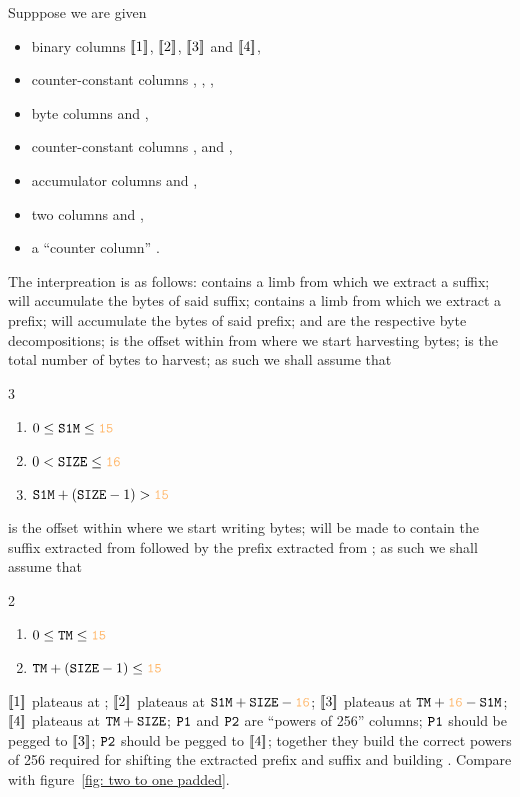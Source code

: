 Supppose we are given
\begin{itemize}
	\item binary columns $[\![1]\!]$, $[\![2]\!]$, $[\![3]\!]$ and $[\![4]\!]$,
	\item counter-constant columns  \sourceOne{}, \sourceTwo{}, \target{},
	\item byte columns \sourceOne{}\byte{} and \sourceTwo{}\byte{},
	\item counter-constant columns \sourceOne{}\mark{}, \target{}\mark{} and \size{},
	\item accumulator columns  and ,
	\item two columns  and ,
	\item a ``counter column'' \ct{}.
\end{itemize}
The interpreation is as follows:
\sourceOne{} contains a limb from which we extract a suffix;
 will accumulate the bytes of said suffix;
\sourceTwo{} contains a limb from which we extract a prefix;
 will accumulate the bytes of said prefix;
\sourceOne{}\byte{} and \sourceTwo{}\byte{} are the respective byte decompositions;
\sourceOne{}\mark{} is the offset within \sourceOne{} from where we start harvesting bytes;
\size{} is the total number of bytes to harvest;
as such we shall assume that
\begin{multicols}{3}
	\begin{enumerate}
		\item $0 \leq \sourceOne\mark \leq \llargeMO$
		\item $0 < \size \leq \llarge$
		\item $\sourceOne{}\mark{} + (\size{}-1) > \llargeMO$
	\end{enumerate}
\end{multicols}
\noindent
\target{}\mark{} is the offset within \target{} where we start writing bytes;
\target{} will be made to contain the suffix extracted from \sourceOne{} followed by the prefix extracted from \sourceTwo{};
as such we shall assume that
\begin{multicols}{2}
	\begin{enumerate}
		\item $0 \leq \target\mark \leq \llargeMO$
		\item $\target{}\mark{} + (\size{}-1) \leq \llargeMO$
	\end{enumerate}
\end{multicols}
\noindent 
$[\![1]\!]$ plateaus at \sourceOne{}\mark{};
$[\![2]\!]$ plateaus at $\sourceOne{}\mark{} + \size{} - \llarge$;
$[\![3]\!]$ plateaus at $\target\mark + \llarge - \sourceOne{}\mark{}$;
$[\![4]\!]$ plateaus at $\texttt{T}\texttt{M} + \texttt{SIZE}{}$;
$\texttt{P1}$ and $\texttt{P2}$ are ``powers of 256'' columns;
$\texttt{P1}$ should be pegged to $[\![3]\!]$;
$\texttt{P2}$ should be pegged to $[\![4]\!]$;
together they build the correct powers of 256 required for shifting the extracted prefix and suffix and building \target{}. Compare with figure~\ref{fig: two to one padded}.

